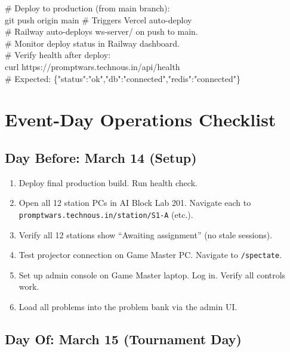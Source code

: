 \documentclass[11pt, a4paper]{article}
\begin{document}
\begin{tcolorbox}[codebox]
\small\color{white}\ttfamily
\textcolor{codegreen}{\# Deploy to production (from main branch):}\\
git push origin main \quad\quad\textcolor{codegreen}{\# Triggers Vercel auto-deploy}\\[0.3em]
\textcolor{codegreen}{\# Railway auto-deploys ws-server/ on push to main.}\\
\textcolor{codegreen}{\# Monitor deploy status in Railway dashboard.}\\[0.3em]
\textcolor{codegreen}{\# Verify health after deploy:}\\
curl https://promptwars.technous.in/api/health\\
\textcolor{codegreen}{\# Expected: \{"status":"ok","db":"connected","redis":"connected"\}}
\end{tcolorbox}

\section{Event-Day Operations Checklist}

\subsection{Day Before: March 14 (Setup)}

\begin{enumerate}[leftmargin=1.5cm, itemsep=3pt]
    \item Deploy final production build. Run health check.
    \item Open all 12 station PCs in AI Block Lab 201. Navigate each to \texttt{promptwars.technous.in/station/S1-A} (etc.).
    \item Verify all 12 stations show ``Awaiting assignment'' (no stale sessions).
    \item Test projector connection on Game Master PC. Navigate to \texttt{/spectate}.
    \item Set up admin console on Game Master laptop. Log in. Verify all controls work.
    \item Load all problems into the problem bank via the admin UI.
\end{enumerate}

\subsection{Day Of: March 15 (Tournament Day)}
\end{document}
